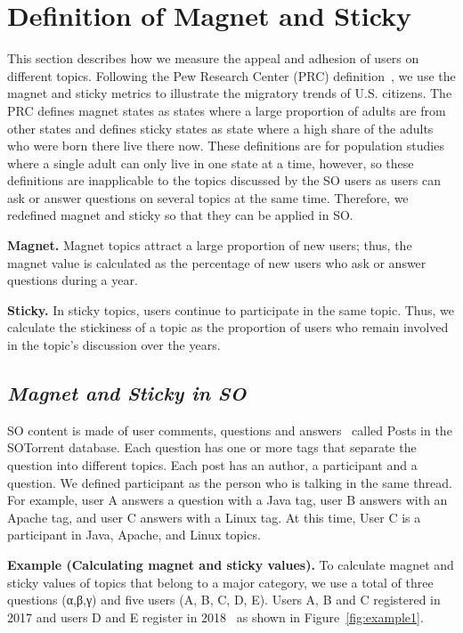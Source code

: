 \documentclass[conference]{IEEEtran}
\begin{document}
\section{Definition of Magnet and Sticky} \label{magnet}
This section describes how we measure the appeal and adhesion of users on different topics. Following the Pew Research Center (PRC) definition~\cite{cohn2009magnet}, we use the magnet and sticky metrics to illustrate the migratory trends of U.S. citizens. The PRC defines magnet states as states where a large proportion of adults are from other states and defines sticky states as state where a high share of the adults who were born there live there now. These definitions are for population studies where a single adult can only live in one state at a time, however, so these definitions are inapplicable to the topics discussed by the SO users as users can ask or answer questions on several topics at the same time. Therefore, we redefined magnet and sticky so that they can be applied in SO. 

\noindent
\textbf{Magnet.} Magnet topics attract a large proportion of new users; thus, the magnet value is calculated as the percentage of new users who ask or answer questions during a year.

\noindent
\textbf{Sticky.} In sticky topics, users continue to participate in the same topic. Thus, we calculate the stickiness of a topic as the proportion of users who remain involved in the topic’s discussion over the years.


\subsection*{\textit{\textbf{Magnet and Sticky in SO}}}

SO content is made of user comments, questions and answers~\cite{liu2018mining} called Posts in the  SOTorrent\cite{baltes2018sotorrent} database. Each question has one or more tags that separate the question into different topics. Each post has an author, a participant and a question. We defined participant as the person who is talking in the same thread. For example, user A answers a question with a Java tag, user B answers with an Apache tag, and user C answers with a Linux tag. At this time, User C is a participant in Java, Apache, and Linux topics.


\noindent
\textbf{Example (Calculating magnet and sticky values).}
To calculate magnet and sticky values of topics that belong to a major category, we use a total of three questions (α,β,γ) and five users (A, B, C, D, E). Users A, B and C registered in 2017 and users D and E register in 2018~\cite{yamashita2016magnet} as shown in Figure~\ref{fig:example1}.
\end{document}
